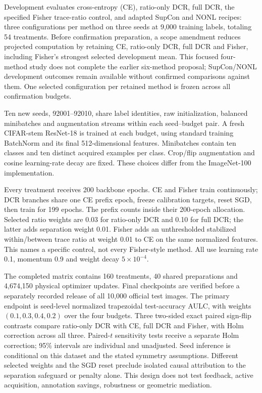 \documentclass[10pt,a4paper,twocolumn]{article}
\begin{document}
Development evaluates cross-entropy (CE), ratio-only DCR, full DCR, the
specified Fisher trace-ratio control, and adapted SupCon and NONL
recipes: three configurations per method on three seeds at 9,000
training labels, totaling 54 treatments. Before confirmation preparation,
a scope amendment reduces projected computation by retaining CE,
ratio-only DCR, full DCR and Fisher,
including Fisher's strongest selected development mean. This focused
four-method study does not complete the earlier six-method proposal;
SupCon/NONL development outcomes remain available without confirmed
comparisons against them. One selected configuration per retained method
is frozen across all confirmation budgets.

Ten new seeds, 92001--92010, share label identities, raw initialization,
balanced minibatches and augmentation streams within each seed--budget
pair. A fresh CIFAR-stem ResNet-18 is trained at each budget, using
standard training BatchNorm and its final 512-dimensional features.
Minibatches contain ten classes and ten distinct acquired examples per
class. Crop/flip augmentation and cosine learning-rate decay are fixed.
These choices differ from the ImageNet-100 implementation.

Every treatment receives 200 backbone epochs. CE and Fisher train
continuously; DCR branches share one CE prefix epoch, freeze calibration
targets, reset SGD, then train for 199 epochs. The prefix counts inside
their 200-epoch allocation. Selected ratio weights are 0.03 for ratio-only
DCR and 0.10 for full DCR; the latter adds separation weight 0.01.
Fisher adds an unthresholded stabilized within/between trace ratio at
weight 0.01 to CE on the same normalized features. This names a specific
control, not every Fisher-style method. All use learning rate 0.1,
momentum 0.9 and weight decay $5\times10^{-4}$.

The completed matrix contains 160 treatments, 40 shared preparations and
4,674,150 physical optimizer updates. Final checkpoints are verified
before a separately recorded release of all 10,000 official test images.
The primary endpoint is seed-level normalized trapezoidal test-accuracy
AULC, with weights $(0.1,0.3,0.4,0.2)$ over the four budgets. Three
two-sided exact paired sign-flip contrasts compare ratio-only DCR with
CE, full DCR and Fisher, with Holm correction across all three.
Paired-$t$ sensitivity tests receive a separate Holm correction;
95\% intervals are individual and unadjusted. Seed inference is
conditional on this dataset and the stated symmetry assumptions.
Different selected weights and the SGD reset preclude isolated causal
attribution to the separation safeguard or penalty alone. This design
does not test feedback, active acquisition, annotation savings, robustness
or geometric mediation.
\end{document}
